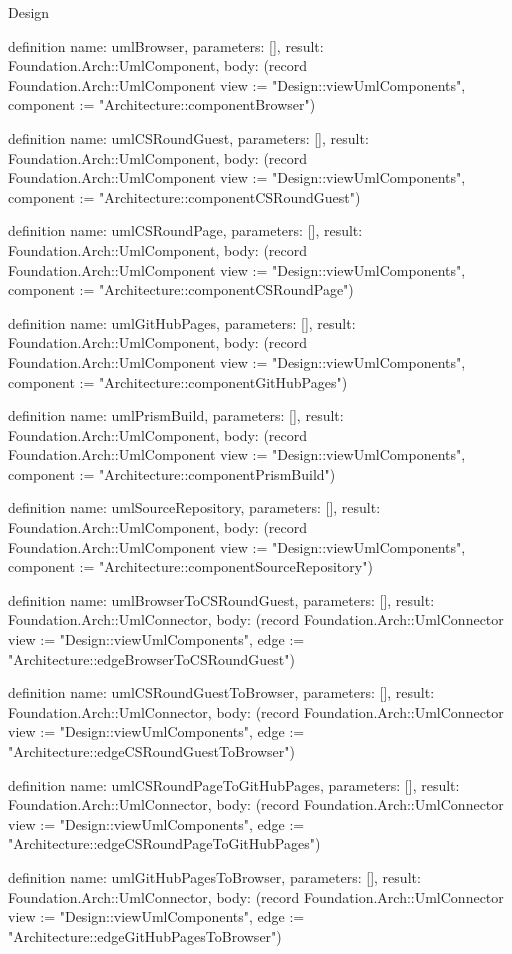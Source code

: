 \begin{lexlean}{Design}
\begin{semanticmodule}
definition{
  name: umlBrowser,
  parameters: [],
  result: Foundation.Arch::UmlComponent,
  body: (record Foundation.Arch::UmlComponent {view := "Design::viewUmlComponents", component := "Architecture::componentBrowser"})
}

definition{
  name: umlCSRoundGuest,
  parameters: [],
  result: Foundation.Arch::UmlComponent,
  body: (record Foundation.Arch::UmlComponent {view := "Design::viewUmlComponents", component := "Architecture::componentCSRoundGuest"})
}

definition{
  name: umlCSRoundPage,
  parameters: [],
  result: Foundation.Arch::UmlComponent,
  body: (record Foundation.Arch::UmlComponent {view := "Design::viewUmlComponents", component := "Architecture::componentCSRoundPage"})
}

definition{
  name: umlGitHubPages,
  parameters: [],
  result: Foundation.Arch::UmlComponent,
  body: (record Foundation.Arch::UmlComponent {view := "Design::viewUmlComponents", component := "Architecture::componentGitHubPages"})
}

definition{
  name: umlPrismBuild,
  parameters: [],
  result: Foundation.Arch::UmlComponent,
  body: (record Foundation.Arch::UmlComponent {view := "Design::viewUmlComponents", component := "Architecture::componentPrismBuild"})
}

definition{
  name: umlSourceRepository,
  parameters: [],
  result: Foundation.Arch::UmlComponent,
  body: (record Foundation.Arch::UmlComponent {view := "Design::viewUmlComponents", component := "Architecture::componentSourceRepository"})
}

definition{
  name: umlBrowserToCSRoundGuest,
  parameters: [],
  result: Foundation.Arch::UmlConnector,
  body: (record Foundation.Arch::UmlConnector {view := "Design::viewUmlComponents", edge := "Architecture::edgeBrowserToCSRoundGuest"})
}

definition{
  name: umlCSRoundGuestToBrowser,
  parameters: [],
  result: Foundation.Arch::UmlConnector,
  body: (record Foundation.Arch::UmlConnector {view := "Design::viewUmlComponents", edge := "Architecture::edgeCSRoundGuestToBrowser"})
}

definition{
  name: umlCSRoundPageToGitHubPages,
  parameters: [],
  result: Foundation.Arch::UmlConnector,
  body: (record Foundation.Arch::UmlConnector {view := "Design::viewUmlComponents", edge := "Architecture::edgeCSRoundPageToGitHubPages"})
}

definition{
  name: umlGitHubPagesToBrowser,
  parameters: [],
  result: Foundation.Arch::UmlConnector,
  body: (record Foundation.Arch::UmlConnector {view := "Design::viewUmlComponents", edge := "Architecture::edgeGitHubPagesToBrowser"})
}


\end{semanticmodule}
\end{lexlean}
